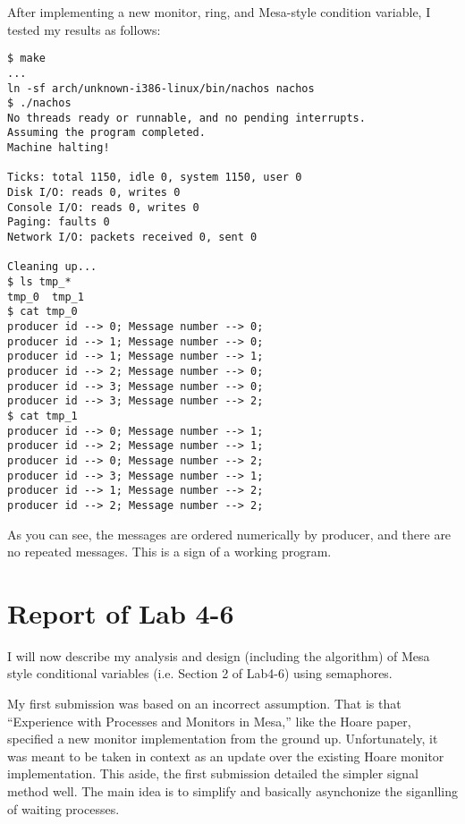 \documentclass[11pt]{article}
\begin{document}
\begin{question}
    After implementing a new monitor, ring, and Mesa-style condition variable, I tested my results as follows:

    \begin{verbatim}
$ make
...
ln -sf arch/unknown-i386-linux/bin/nachos nachos
$ ./nachos
No threads ready or runnable, and no pending interrupts.
Assuming the program completed.
Machine halting!

Ticks: total 1150, idle 0, system 1150, user 0
Disk I/O: reads 0, writes 0
Console I/O: reads 0, writes 0
Paging: faults 0
Network I/O: packets received 0, sent 0

Cleaning up...
$ ls tmp_*
tmp_0  tmp_1
$ cat tmp_0
producer id --> 0; Message number --> 0;
producer id --> 1; Message number --> 0;
producer id --> 1; Message number --> 1;
producer id --> 2; Message number --> 0;
producer id --> 3; Message number --> 0;
producer id --> 3; Message number --> 2;
$ cat tmp_1
producer id --> 0; Message number --> 1;
producer id --> 2; Message number --> 1;
producer id --> 0; Message number --> 2;
producer id --> 3; Message number --> 1;
producer id --> 1; Message number --> 2;
producer id --> 2; Message number --> 2;
    \end{verbatim}

    As you can see, the messages are ordered numerically by producer, and there are no repeated messages. This is a sign of a working program.

\end{question}

\section{Report of Lab 4-6}
\setcounter{qsection}{0}

\begin{question}

    I will now describe my analysis and design (including the algorithm) of Mesa style conditional variables (i.e. Section 2 of Lab4-6) using semaphores.

    My first submission was based on an incorrect assumption. That is that ``Experience with Processes and Monitors in Mesa,'' like the Hoare paper, specified a new monitor implementation from the ground up. Unfortunately, it was meant to be taken in context as an update over the existing Hoare monitor implementation. This aside, the first submission detailed the simpler signal method well. The main idea is to simplify and basically asynchonize the siganlling of waiting processes.

\end{question}
\end{document}
